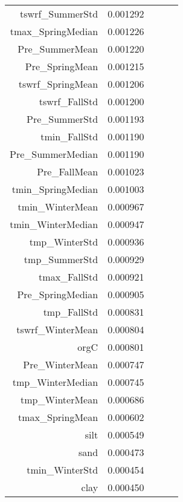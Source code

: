 \begin{tabular}{rrrrr}
tswrf_SummerStd & 0.001292 \\
tmax_SpringMedian & 0.001226 \\
Pre_SummerMean & 0.001220 \\
Pre_SpringMean & 0.001215 \\
tswrf_SpringMean & 0.001206 \\
tswrf_FallStd & 0.001200 \\
Pre_SummerStd & 0.001193 \\
tmin_FallStd & 0.001190 \\
Pre_SummerMedian & 0.001190 \\
Pre_FallMean & 0.001023 \\
tmin_SpringMedian & 0.001003 \\
tmin_WinterMean & 0.000967 \\
tmin_WinterMedian & 0.000947 \\
tmp_WinterStd & 0.000936 \\
tmp_SummerStd & 0.000929 \\
tmax_FallStd & 0.000921 \\
Pre_SpringMedian & 0.000905 \\
tmp_FallStd & 0.000831 \\
tswrf_WinterMean & 0.000804 \\
orgC & 0.000801 \\
Pre_WinterMean & 0.000747 \\
tmp_WinterMedian & 0.000745 \\
tmp_WinterMean & 0.000686 \\
tmax_SpringMean & 0.000602 \\
silt & 0.000549 \\
sand & 0.000473 \\
tmin_WinterStd & 0.000454 \\
clay & 0.000450 \\
\bottomrule
\end{tabular}
